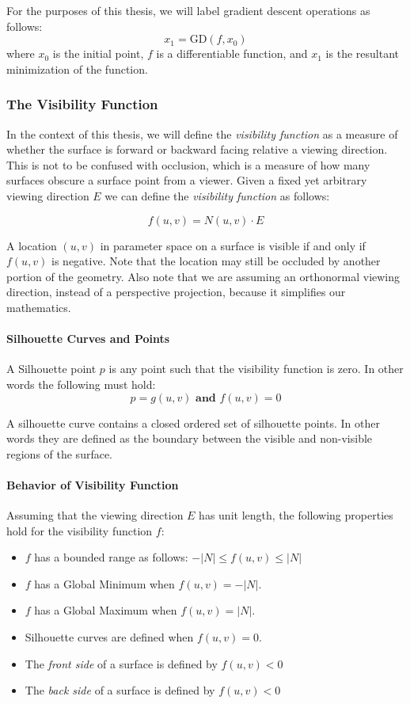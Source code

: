 \documentclass[12pt, letterpaper]{article}
\begin{document}
		For the purposes of this thesis, we will label gradient descent operations as follows:
		$$ x_{1} = \text{GD}(f, x_{0})$$ where $x_{0}$ is the initial point, $f$ is a differentiable function, and $x_{1}$ is the resultant minimization of the function.
		
		\newpage
		\subsubsection{The Visibility Function}

		In the context of this thesis, we will define the \emph{visibility function} as a measure of
		whether the surface is forward or backward facing relative a viewing direction. This is not to be confused with occlusion, which is a measure of
		how many surfaces obscure a surface point from a viewer.
		Given a fixed yet arbitrary viewing direction $E$ we can define the \emph{visibility function} as follows:

		$$f(u, v) = N(u, v) \cdot E$$

		A location $(u, v)$ in parameter space on a surface is visible if and only if $f(u, v)$ is negative.
		Note that the location may still be occluded by another portion of the geometry.
		Also note that we are assuming an orthonormal viewing direction, instead of a perspective projection,
		because it simplifies our mathematics. \cite{XJY98}

		\paragraph{Silhouette Curves and Points}

		A Silhouette point $p$ is any point such that the visibility function is zero. In other words the following must hold:
		$$p = g(u, v) \textbf{ and } f(u, v) = 0$$

		A silhouette curve contains a closed ordered set of silhouette points. In other words they are defined as the boundary between the visible and non-visible regions of the surface.

		\paragraph{Behavior of Visibility Function}

			Assuming that the viewing direction $E$ has unit length, the following properties hold for the visibility function $f$:

			\begin{itemize}
			\item $f$ has a bounded range as follows: $-|N| \le f(u, v) \le |N|$
			\item $f$ has a Global Minimum when $f(u, v) = -|N|$.
			\item $f$ has a Global Maximum when $f(u, v) = |N|$.
			\item Silhouette curves are defined when $f(u, v) = 0$.
			\item The \emph{front side} of a surface is defined by $f(u, v) < 0$
			\item The \emph{back side} of a surface is defined by $f(u, v) < 0$
			\end{itemize}
\end{document}
